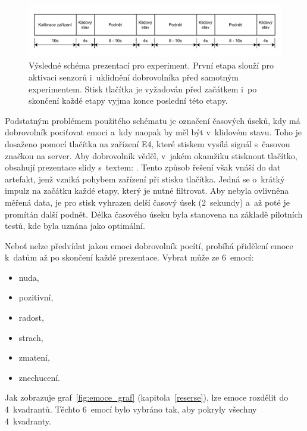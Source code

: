     \begin{figure}[H]
        \centering
        \includegraphics[width=\textwidth]{obrazky-figures/prezentace_schema.pdf}
        \caption{Výsledné schéma prezentací pro experiment. První etapa  slouží pro aktivaci senzorů i~uklidnění dobrovolníka před samotným experimentem. Stisk tlačítka je vyžadován před začátkem i~po skončení každé etapy  vyjma konce poslední této etapy.}
        \label{fig:schema_prezentace}
    \end{figure}
    
    Podstatným problémem použitého schématu je označení časových úseků, kdy má dobrovolník pociťovat emoci a~kdy naopak by měl být v~klidovém stavu. Toho je dosaženo pomocí tlačítka na zařízení E4, které stiskem vysílá signál s~časovou značkou na server. Aby dobrovolník věděl, v~jakém okamžiku stisknout tlačítko, obsahují prezentace slidy s~textem: . Tento způsob řešení však vnáší do dat artefakt, jenž vzniká pohybem zařízení při stisku tlačítka. Jedná se o~krátký impulz na začátku každé etapy, který je nutné filtrovat. Aby nebyla ovlivněna měřená data, je pro stisk vyhrazen delší časový úsek (2~sekundy) a~až poté je promítán další podnět. Délka časového úseku byla stanovena na základě pilotních testů, kde byla uznána jako optimální.
    
    \vspace{3mm}
    
    Neboť nelze předvídat jakou emoci dobrovolník pocítí, probíhá přidělení emoce k~datům až po skončení každé prezentace. Vybrat může ze 6~emocí: 
    \begin{itemize}
        \item nuda,
        \item pozitivní,
        \item radost,
        \item strach,
        \item zmatení,
        \item znechucení.
    \end{itemize}
    
    Jak zobrazuje graf~\ref{fig:emoce_graf} (kapitola~\ref{reserse}), lze emoce rozdělit do 4~kvadrantů. Těchto 6~emocí bylo vybráno tak, aby pokryly všechny 4~kvadranty. 
    
